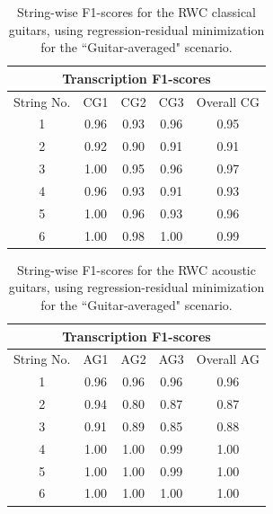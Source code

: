 \documentclass[12pt]{cmuthesis}
\begin{document}
\begin{table}[!htbp]
\begin{center}
\begin{tabular}{||c|c|c|c|c||}
\hline
\multicolumn{5}{||c||}{\bf{Transcription F1-scores}} \\
\hline
String No. & CG1 & CG2 & CG3 & Overall CG \\
\hline
1 & 0.96 & 0.93 & 0.96 & 0.95\\
\hline
2 & 0.92 & 0.90 & 0.91 & 0.91\\
\hline
3 & 1.00 & 0.95 & 0.96 & 0.97\\
\hline
4 & 0.96 & 0.93 & 0.91 & 0.93\\
\hline
5 & 1.00 & 0.96 & 0.93 & 0.96 \\
\hline
6 & 1.00 & 0.98 & 1.00 & 0.99\\ 
\hline
\hline
\end{tabular}
\caption{String-wise F1-scores for the RWC classical guitars, using regression-residual minimization for the ``Guitar-averaged" scenario.} 
\label{tab:cg-str-f}
\end{center}
\end{table}

\begin{table}[!htbp]
\begin{center}
\begin{tabular}{||c||c|c|c|c||}
\hline
\multicolumn{5}{||c||}{\bf{Transcription F1-scores}} \\
\hline
String No. & AG1 & AG2 & AG3 & Overall AG \\
\hline
1 &  0.96 & 0.96 & 0.96 & 0.96 \\
\hline
2 & 0.94 & 0.80 & 0.87 &  0.87\\
\hline
3 & 0.91 & 0.89 & 0.85 & 0.88\\
\hline
4 & 1.00 & 1.00 & 0.99 &  1.00 \\
\hline
5 & 1.00 & 1.00 & 0.99 &  1.00 \\
\hline
6 & 1.00 & 1.00 & 1.00 & 1.00 \\ 
\hline
\hline
\end{tabular}
\caption{String-wise F1-scores for the RWC acoustic guitars, using regression-residual minimization for the ``Guitar-averaged" scenario.} 
\label{tab:ag-str-f}
\end{center}
\end{table}
\end{document}
